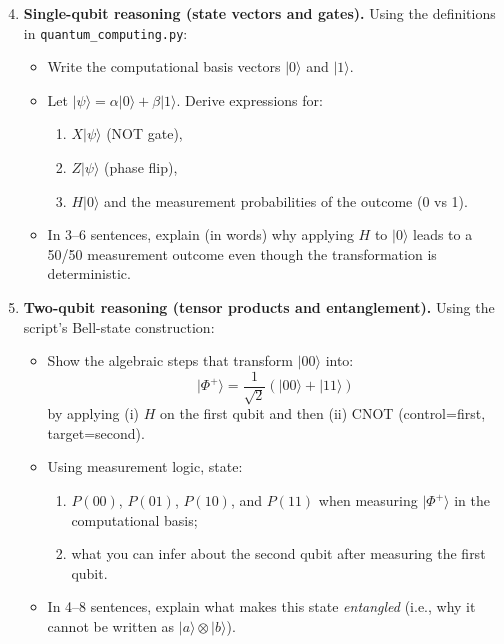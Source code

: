 \documentclass[11pt]{article}
\begin{document}
  \begin{enumerate}
\setcounter{enumi}{3}

\item \textbf{Single-qubit reasoning (state vectors and gates).}
Using the definitions in \texttt{quantum\_computing.py}:
\begin{itemize}
  \item Write the computational basis vectors $|0\rangle$ and $|1\rangle$.
  \item Let $|\psi\rangle = \alpha|0\rangle + \beta|1\rangle$. Derive expressions for:
  \begin{enumerate}
    \item $X|\psi\rangle$ (NOT gate),
    \item $Z|\psi\rangle$ (phase flip),
    \item $H|0\rangle$ and the measurement probabilities of the outcome (0 vs 1).
  \end{enumerate}
  \item In 3--6 sentences, explain (in words) why applying $H$ to $|0\rangle$ leads to a 50/50 measurement outcome even though the transformation is deterministic.
\end{itemize}

\item \textbf{Two-qubit reasoning (tensor products and entanglement).}
Using the script's Bell-state construction:
\begin{itemize}
  \item Show the algebraic steps that transform $|00\rangle$ into:
  \[
  |\Phi^+\rangle = \frac{1}{\sqrt{2}}(|00\rangle + |11\rangle)
  \]
  by applying (i) $H$ on the first qubit and then (ii) CNOT (control=first, target=second).
  \item Using measurement logic, state:
  \begin{enumerate}
    \item $P(00)$, $P(01)$, $P(10)$, and $P(11)$ when measuring $|\Phi^+\rangle$ in the computational basis;
    \item what you can infer about the second qubit after measuring the first qubit.
  \end{enumerate}
  \item In 4--8 sentences, explain what makes this state \emph{entangled} (i.e., why it cannot be written as $|a\rangle \otimes |b\rangle$).
\end{itemize}


\end{enumerate}
\end{document}
